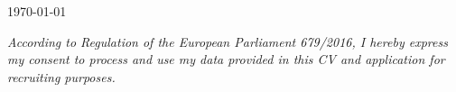 \documentclass[10.5pt,a4paper,final,roman]{moderncv}
\begin{document}
\vspace{2mm}

\vspace{1.5cm}
\today		

\emptysection{}\closesection
\vfill
\begin{center}

	\textit{\small According to Regulation of the European Parliament
		679/2016, I hereby express my consent to process and use my data provided in
		this CV and application for recruiting purposes.}
\end{center}
\end{document}
